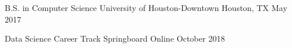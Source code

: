 

\begin{cventries}
	
	\cventryschool
	{B.S. in Computer Science} %
	{University of Houston-Downtown} %
	{Houston, TX} %
	{May 2017} %
	{
		\begin{cvitems} %
			\item {}
		\end{cvitems}
	}
	
	
	\cventryschool
	{Data Science Career Track} %
	{Springboard} %
	{Online} %
	{October 2018} %
	{
		\begin{cvitems} %
			\item {}
		\end{cvitems}
	}
	\vspace*{-4mm}
\end{cventries}

